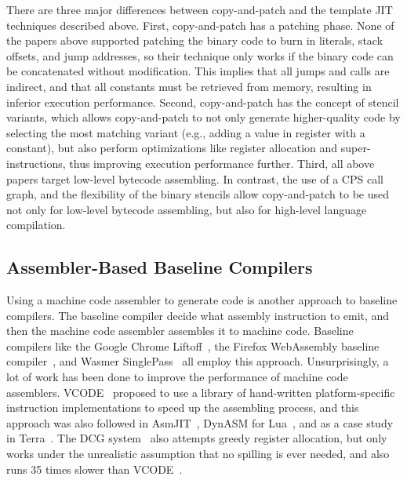 \documentclass[acmsmall,nonacm,screen]{acmart}\settopmatter{printfolios=true,printccs=true,printacmref=false}
\newcommand{\cp}{copy-and-patch}
\begin{document}
There are three major differences between \cp{} and the template JIT techniques described above. First, \cp{} has a patching phase. None of the papers above supported patching the binary code to burn in literals, stack offsets, and jump addresses, so their technique only works if the binary code can be concatenated without modification. This implies that all jumps and calls are indirect, and that all constants must be retrieved from memory, resulting in inferior execution performance. Second, \cp{} has the concept of stencil variants, which allows \cp{} to not only generate higher-quality code by selecting the most matching variant (e.g., adding a value in register with a constant), but also perform optimizations like register allocation and super-instructions, thus improving execution performance further. Third, all above papers target low-level bytecode assembling. In contrast, the use of a CPS call graph, and the flexibility of the binary stencils allow \cp{} to be used not only for low-level bytecode assembling, but also for high-level language compilation.

\subsection*{Assembler-Based Baseline Compilers}
\label{sec:assemblers}

Using a machine code assembler to generate code is another approach to baseline compilers. The baseline compiler decide what assembly instruction to emit, and then the machine code assembler assembles it to machine code. 
Baseline compilers like the Google Chrome Liftoff~\cite{liftoffBlog}, the Firefox WebAssembly baseline compiler~\cite{firefoxWasmBaselineBlog1}, and Wasmer SinglePass~\cite{wasmerSinglepassJit} all employ this approach. Unsurprisingly, a lot of work has been done to improve the performance of machine code assemblers. VCODE~\cite{engler1996} proposed to use a library of hand-written platform-specific instruction implementations to speed up the assembling process, and this approach was also followed in AsmJIT~\cite{asmjit}, DynASM for Lua~\cite{dynasm}, and as a case study in Terra~\cite{devito2014}. The DCG system~\cite{engler1994} also attempts greedy register allocation, but only works under the unrealistic assumption that no spilling is ever needed, and also runs 35 times slower than VCODE~\cite{engler1996}. 
\end{document}
